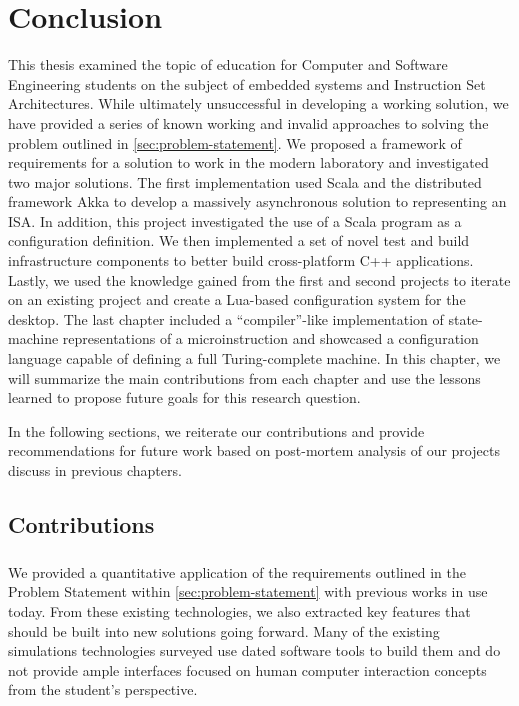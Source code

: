 \chapter{Conclusion}
\label{ch:conclusion}

This thesis examined the topic of education for Computer and Software Engineering students on the subject of embedded systems and Instruction Set Architectures. While ultimately unsuccessful in developing a working solution, we have provided a series of known working and invalid approaches to solving the problem outlined in \cref{sec:problem-statement}. We proposed a framework of requirements for a solution to work in the modern laboratory and investigated two major solutions. The first implementation used Scala and the distributed framework Akka to develop a massively asynchronous solution to representing an ISA. In addition, this project investigated the use of a Scala program as a configuration definition. We then implemented a set of novel test and build infrastructure components to better build cross-platform C++ applications. Lastly, we used the knowledge gained from the first and second projects to iterate on an existing project and create a Lua-based configuration system for the desktop. The last chapter included a ``compiler''-like implementation of state-machine representations of a microinstruction and showcased a configuration language capable of defining a full Turing-complete machine. In this chapter, we will summarize the main contributions from each chapter and use the lessons learned to propose future goals for this research question. 

In the following sections, we reiterate our contributions and provide recommendations for future work based on post-mortem analysis of our projects discuss in previous chapters.  

\section{Contributions}

\paragraph{} We provided a quantitative application of the requirements outlined in the Problem Statement within \cref{sec:problem-statement} with previous works in use today. From these existing technologies, we also extracted key features that should be built into new solutions going forward. Many of the existing simulations technologies surveyed use dated software tools to build them and do not provide ample interfaces focused on human computer interaction concepts from the student's perspective. 

